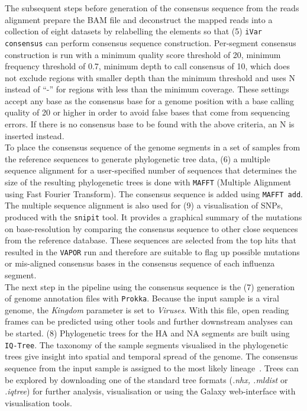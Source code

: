 The subsequent steps before generation of the consensus sequence from the reads alignment prepare the \ac{BAM} file and deconstruct the mapped reads into a collection of eight datasets by relabelling the elements so that (5) \texttt{iVar consensus} can perform consensus sequence construction. Per-segment consensus construction is run with a minimum quality score threshold of 20, minimum frequency threshold of 0.7, minimum depth to call consensus of 10, which does not exclude regions with smaller depth than the minimum threshold and uses N instead of ``-'' for regions with less than the minimum coverage. These settings accept any base as the consensus base for a genome position with a base calling quality of 20 or higher in order to avoid false bases that come from sequencing errors. If there is no consensus base to be found with the above criteria, an N is inserted instead. \\
To place the consensus sequence of the genome segments in a set of samples from the reference sequences to generate phylogenetic tree data, (6) a multiple sequence alignment for a user-specified number of sequences that determines the size of the resulting phylogenetic trees is done with \texttt{MAFFT} (Multiple Alignment using Fast Fourier Transform). The consensus sequence is added using \texttt{MAFFT add}. The multiple sequence alignment is also used for (9) a visualisation of SNPs, produced with the \texttt{snipit} tool. It provides a graphical summary of the mutations on base-resolution by comparing the consensus sequence to other close sequences from the reference database. These sequences are selected from the top hits that resulted in the \texttt{VAPOR} run and therefore are suitable to flag up possible mutations or mis-aligned consensus bases in the consensus sequence of each influenza segment. \\
The next step in the pipeline using the consensus sequence is the (7) generation of genome annotation files with \texttt{Prokka}. Because the input sample is a viral genome, the \textit{Kingdom} parameter is set to \textit{Viruses}. With this file, open reading frames can be predicted using other tools and further downstream analyses can be started. (8) Phylogenetic trees for the \ac{HA} and \ac{NA} segments are built using \texttt{IQ-Tree}. The taxonomy of the sample segments visualised in the phylogenetic trees give insight into spatial and temporal spread of the genome. The consensus sequence from the input sample is assigned to the most likely lineage~\cite{minh2020iq}. Trees can be explored by downloading one of the standard tree formats (\textit{.nhx, .mldist} or \textit{.iqtree}) for further analysis, visualisation or using the Galaxy web-interface with visualisation tools. \\
